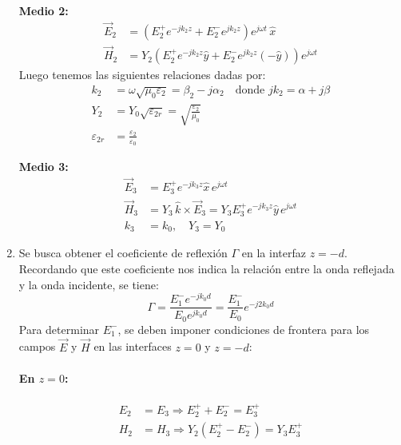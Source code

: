 \documentclass[
  11pt,
  letterpaper,
   addpoints,
   answers
  ]{exam}
\begin{document}
\begin{questions}
\begin{solution}
\begin{enumerate}
\textbf{Medio 2:}
\begin{align*}
\vec{E}_2 &= \left( E_2^+ e^{-j k_2 z} + E_2^- e^{j k_2 z} \right) e^{j \omega t} \, \hat{x} \\
\vec{H}_2 &= Y_2 \left( E_2^+ e^{-j k_2 z} \hat{y} + E_2^- e^{j k_2 z} (-\hat{y}) \right) e^{j \omega t} 
\end{align*}
Luego tenemos las siguientes relaciones dadas por:
\begin{align*}
k_2 &= \omega \sqrt{\mu_0 \varepsilon_2} = \beta_2 - j \alpha_2 \quad \text{donde } j k_2 = \alpha + j \beta \\
Y_2 &= Y_0 \sqrt{\varepsilon_{2r}} = \sqrt{\frac{\varepsilon_2}{\mu_0}} \\
\varepsilon_{2r} &= \frac{\varepsilon_2}{\varepsilon_0}
\end{align*}

\textbf{Medio 3:}
\begin{align*}
\vec{E}_3 &= E_3^+ e^{-j k_3 z} \hat{x} \, e^{j \omega t} \\
\vec{H}_3 &= Y_3 \, \hat{k} \times \vec{E}_3 = Y_3 E_3^+ e^{-j k_3 z} \hat{y} \, e^{j \omega t} \\
k_3 &= k_0, \quad Y_3 = Y_0
\end{align*}

\item Se busca obtener el coeficiente de reflexión \( \Gamma \) en la interfaz \( z = -d \). Recordando que este coeficiente nos indica la relación entre la onda reflejada y la onda incidente, se tiene:
\begin{equation}
\Gamma = \frac{E_1^- e^{-j k_0 d}}{E_0 e^{j k_0 d}} = \frac{E_1^-}{E_0} e^{-j 2 k_0 d}
\end{equation}
Para determinar \( E_1^- \), se deben imponer condiciones de frontera para los campos \( \vec{E} \) y \( \vec{H} \) en las interfaces \( z = 0 \) y \( z = -d \):

\paragraph{En \( z = 0 \):}
\begin{align}
E_2 &= E_3 \Rightarrow E_2^+ + E_2^- = E_3^+ \\
H_2 &= H_3 \Rightarrow Y_2 (E_2^+ - E_2^-) = Y_3 E_3^+
\end{align}


\end{enumerate}
\end{solution}
\end{questions}
\end{document}
